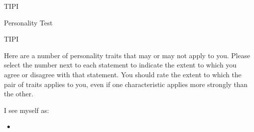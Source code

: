 
\begin{edXchapter}{TIPI}


\begin{edXsection}{Personality Test}

\begin{edXproblem}{TIPI}

Here are a number of personality traits that may or may not apply to you.  Please select the number next to each statement to indicate the extent to which you agree or disagree with that statement. You should rate the extent to which the pair of traits applies to you, even if one characteristic applies more strongly than the other.           
 
I see myself as:

\begin{itemize}
\item {} 


\end{itemize}
%


\end{edXproblem}
\end{edXsection}
\end{edXchapter}
